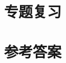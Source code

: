 \section*{专题复习}


\begin{enumerate}
\foreachproblem[leibiyimo]{\newpage\item\label{prob:\thisproblemlabel}\thisproblem}
\end{enumerate}

\begin{enumerate}
\foreachproblem[leibiermo]{\newpage\item\label{prob:\thisproblemlabel}\thisproblem}
\end{enumerate}


\begin{enumerate}
\foreachproblem[leibizhongkao]{\newpage\item\label{prob:\thisproblemlabel}\thisproblem}
\end{enumerate}

\begin{enumerate}
\foreachproblem[leibi]{\newpage\item\label{prob:\thisproblemlabel}\thisproblem}
\end{enumerate}


\newpage
\showanswers
\section*{参考答案}
\begin{itemize}
\end{itemize}